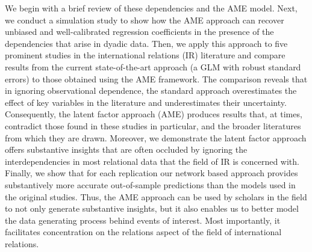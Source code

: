 We begin with a brief review of these dependencies and the AME model. Next, we conduct a simulation study to show how the AME approach can recover unbiased and well-calibrated regression coefficients in the presence of the dependencies that arise in dyadic data. Then, we apply this approach to five prominent studies in the international relations (IR) literature and compare results from the current state-of-the-art approach (a GLM with robust standard errors) to those obtained using the AME framework. The comparison reveals that in ignoring observational dependence, the standard approach overestimates the effect of key variables in the literature and underestimates their uncertainty. Consequently, the latent factor approach (AME) produces results that, at times, contradict those found in these studies in particular, and the broader literatures from which they are drawn. Moreover, we demonstrate the latent factor approach offers substantive insights that are often occluded by ignoring the interdependencies in most relational data that the field of IR is concerned with. Finally, we show that for each replication our network based approach provides substantively more accurate out-of-sample predictions than the models used in the original studies. Thus, the AME approach can be used by scholars in the field to not only generate substantive insights, but it also enables us to better model the data generating process behind events of interest.  Most importantly, it facilitates concentration on the relations aspect of the field of international relations.